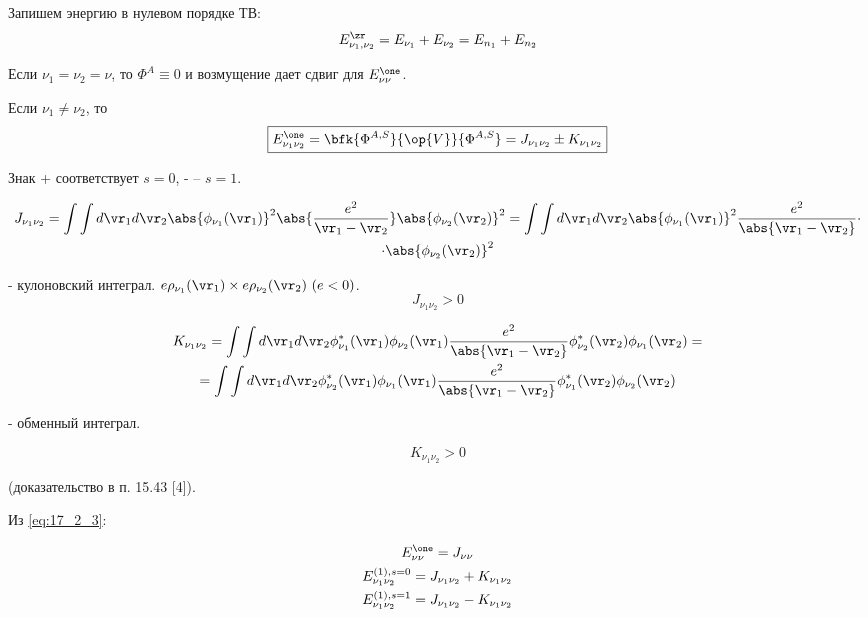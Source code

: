Запишем энергию в нулевом порядке ТВ:
$$
E_{\nu_1, \nu_2}^\zr = E_{\nu_1} + E_{\nu_2} = E_{n_1} + E_{n_2}
$$

Если  $\nu_1 = \nu_2= \nu$, то $\Phi^A \equiv 0$ и возмущение дает сдвиг для $E_{\nu \nu}^\one$.

Если  $\nu_1 \not = \nu_2$, то
\begin{equation}
\label{eq:17_2_3}
\boxed{E_{\nu_1 \nu_2}^\one = \bfk{\Phi^{A, S}}{\op{V}}{\Phi^{A, S}} = J_{\nu_1 \nu_2} \pm K_{\nu_1 \nu_2}} 
\end{equation}

Знак + соответствует $s = 0$, - -- $s = 1$.

\begin{gather}
\label{eq:17_2_4}
J_{\nu_1 \nu_2} = \int \int d\vr_1 d\vr_2 \abs{\phi_{\nu_1}(\vr_1)}^2 \abs{\frac{e^2}{\vr_1 - \vr_2}} \abs{\phi_{\nu_2}(\vr_2)}^2 = \int \int d\vr_1 d\vr_2 \abs{\phi_{\nu_1}(\vr_1)}^2 \frac{e^2}{\abs{\vr_1 - \vr_2}} \cdot \nonumber \\ \cdot \abs{\phi_{\nu_2}(\vr_2)}^2
\end{gather}

- кулоновский интеграл. $e\rho_{\nu_1}(\vr_1) \times e\rho_{\nu_2}(\vr_2)~(e < 0)$.
$$
J_{\nu_1 \nu_2} > 0
$$

\begin{gather}
\label{eq:17_2_5}
K_{\nu_1 \nu_2} = \int \int d\vr_1 d\vr_2 \phi^*_{\nu_1}(\vr_1) \phi_{\nu_2}(\vr_1)\frac{e^2}{\abs{\vr_1 - \vr_2}}  \phi^*_{\nu_2}(\vr_2) \phi_{\nu_1}(\vr_2) = \nonumber \\
= \int \int d\vr_1 d\vr_2 \phi^*_{\nu_2}(\vr_1) \phi_{\nu_1}(\vr_1)\frac{e^2}{\abs{\vr_1 - \vr_2}}  \phi^*_{\nu_1}(\vr_2) \phi_{\nu_2}(\vr_2)
\end{gather}

- обменный интеграл.

$$
K_{\nu_1 \nu_2} > 0
$$

(доказательство в п. 15.43 [4]).

Из \eqref{eq:17_2_3}:

\begin{gather*}
E_{\nu\nu}^\one = J_{\nu\nu} \\
E_{\nu_1 \nu_2}^{(1), s=0} = J_{\nu_1\nu_2} + K_{\nu_1\nu_2} \\
E_{\nu_1 \nu_2}^{(1), s=1} = J_{\nu_1\nu_2} - K_{\nu_1\nu_2} 
\end{gather*}